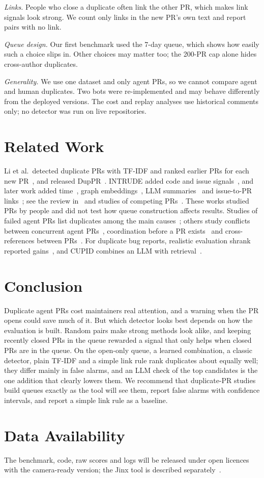 \documentclass[10pt,conference]{IEEEtran}
\begin{document}
\emph{Links.} People who close a duplicate often link the other PR, which makes link signals look strong. We count only links in the new PR's own text and report pairs with no link.

\emph{Queue design.} Our first benchmark used the 7-day queue, which shows how easily such a choice slips in. Other choices may matter too; the 200-PR cap alone hides \capCross{} cross-author duplicates.

\emph{Generality.} We use one dataset and only agent PRs, so we cannot compare agent and human duplicates. Two bots were re-implemented and may behave differently from the deployed versions. The cost and replay analyses use historical comments only; no detector was run on live repositories.

\section{Related Work}
Li et al.\ detected duplicate PRs with TF-IDF and ranked earlier PRs for each new PR~\cite{li2017detecting}, and released DupPR~\cite{yu2018dataset}. INTRUDE added code and issue signals~\cite{ren2019intrude}, and later work added time~\cite{wang2019time}, graph embeddings~\cite{jiang2023duphunter}, LLM summaries~\cite{liao2024dupllm} and issue-to-PR links~\cite{galbraith2025duplicate}; see the review in~\cite{benchekaya2026slr} and studies of competing PRs~\cite{zhang2018competing,li2022redundancy}. These works studied PRs by people and did not test how queue construction affects results. Studies of failed agent PRs list duplicates among the main causes~\cite{ehsani2026fail,alam2026unmerged,nakashima2026rejected,abujadallah2026rejection}; others study conflicts between concurrent agent PRs~\cite{xu2026conflicts}, coordination before a PR exists~\cite{sarkar2026before} and cross-references between PRs~\cite{khemissi2026humans}. For duplicate bug reports, realistic evaluation shrank reported gains~\cite{zhang2023howfar}, and CUPID combines an LLM with retrieval~\cite{cupid2023}.

\section{Conclusion}
Duplicate agent PRs cost maintainers real attention, and a warning when the PR opens could save much of it. But which detector looks best depends on how the evaluation is built. Random pairs make strong methods look alike, and keeping recently closed PRs in the queue rewarded a signal that only helps when closed PRs are in the queue. On the open-only queue, a learned combination, a classic detector, plain TF-IDF and a simple link rule rank duplicates about equally well; they differ mainly in false alarms, and an LLM check of the top candidates is the one addition that clearly lowers them. We recommend that duplicate-PR studies build queues exactly as the tool will see them, report false alarms with confidence intervals, and report a simple link rule as a baseline.

\section*{Data Availability}
The benchmark, code, raw scores and logs will be released under open licences with the camera-ready version; the Jinx tool is described separately~\cite{jinxtool}.


\end{document}
